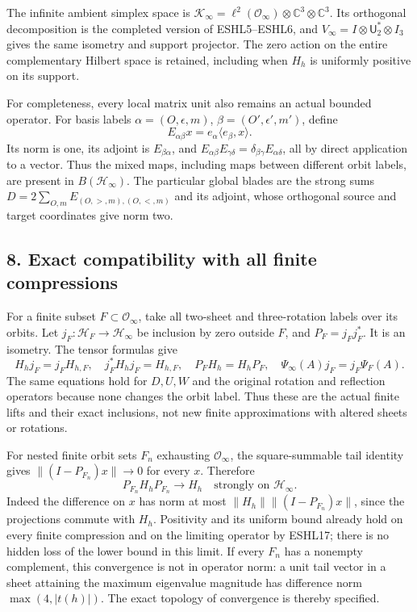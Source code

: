 \documentclass[
  10pt,
  a4paper,
]{article}
\newcounter{none} %
\begin{document}
The infinite ambient simplex space is
\(\mathcal K_\infty=\ell^2(\mathcal O_\infty)\otimes\mathbb C^3\otimes\mathbb C^3\).
Its orthogonal decomposition is the completed version of ESHL5--ESHL6,
and \(V_\infty=I\otimes\mathsf U_2^*\otimes I_3\) gives the same
isometry and support projector. The zero action on the entire
complementary Hilbert space is retained, including when \(H_h\) is
uniformly positive on its support.

For completeness, every local matrix unit also remains an actual bounded
operator. For basis labels \(\alpha=(O,\epsilon,m)\),
\(\beta=(O',\epsilon',m')\), define \[
E_{\alpha\beta}x=e_\alpha\langle e_\beta,x\rangle.
\tag{ESHL38}
\] Its norm is one, its adjoint is \(E_{\beta\alpha}\), and
\(E_{\alpha\beta}E_{\gamma\delta}=\delta_{\beta\gamma}E_{\alpha\delta}\),
all by direct application to a vector. Thus the mixed maps, including
maps between different orbit labels, are present in
\(B(\mathcal H_\infty)\). The particular global blades are the strong
sums \(D=2\sum_{O,m}E_{(O,>,m),(O,<,m)}\) and its adjoint, whose
orthogonal source and target coordinates give norm two.

\subsection{8. Exact compatibility with all finite
compressions}\label{exact-compatibility-with-all-finite-compressions}

For a finite subset \(F\subset\mathcal O_\infty\), take all two-sheet
and three-rotation labels over its orbits. Let
\(j_F:\mathcal H_F\to\mathcal H_\infty\) be inclusion by zero outside
\(F\), and \(P_F=j_Fj_F^*\). It is an isometry. The tensor formulas give
\[
H_hj_F=j_FH_{h,F},\quad j_F^*H_hj_F=H_{h,F},
\quad P_FH_h=H_hP_F,
\quad\Psi_\infty(A)j_F=j_F\Psi_F(A).
\tag{ESHL39}
\] The same equations hold for \(D,U,W\) and the original rotation and
reflection operators because none changes the orbit label. Thus these
are the actual finite lifts and their exact inclusions, not new finite
approximations with altered sheets or rotations.

For nested finite orbit sets \(F_n\) exhausting \(\mathcal O_\infty\),
the square-summable tail identity gives \(\|(I-P_{F_n})x\|\to0\) for
every \(x\). Therefore \[
P_{F_n}H_hP_{F_n}\longrightarrow H_h
\quad\text{strongly on }\mathcal H_\infty.
\tag{ESHL40}
\] Indeed the difference on \(x\) has norm at most
\(\|H_h\|\|(I-P_{F_n})x\|\), since the projections commute with \(H_h\).
Positivity and its uniform bound already hold on every finite
compression and on the limiting operator by ESHL17; there is no hidden
loss of the lower bound in this limit. If every \(F_n\) has a nonempty
complement, this convergence is not in operator norm: a unit tail vector
in a sheet attaining the maximum eigenvalue magnitude has difference
norm \(\max(4,|t(h)|)\). The exact topology of convergence is thereby
specified.
\end{document}
